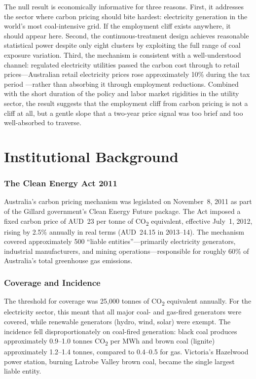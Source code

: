 \documentclass[12pt]{article}
\begin{document}
The null result is economically informative for three reasons. First, it addresses the sector where carbon pricing should bite hardest: electricity generation in the world's most coal-intensive grid. If the employment cliff exists anywhere, it should appear here. Second, the continuous-treatment design achieves reasonable statistical power despite only eight clusters by exploiting the full range of coal exposure variation. Third, the mechanism is consistent with a well-understood channel: regulated electricity utilities passed the carbon cost through to retail prices---Australian retail electricity prices rose approximately 10\% during the tax period \citep{ogorman2014impact}---rather than absorbing it through employment reductions. Combined with the short duration of the policy and labor market rigidities in the utility sector, the result suggests that the employment cliff from carbon pricing is not a cliff at all, but a gentle slope that a two-year price signal was too brief and too well-absorbed to traverse.


\section{Institutional Background}

\subsubsection*{The Clean Energy Act 2011} Australia's carbon pricing mechanism was legislated on November~8, 2011 as part of the Gillard government's Clean Energy Future package. The Act imposed a fixed carbon price of AUD~23 per tonne of CO\textsubscript{2} equivalent, effective July~1, 2012, rising by 2.5\% annually in real terms (AUD~24.15 in 2013--14). The mechanism covered approximately 500 ``liable entities''---primarily electricity generators, industrial manufacturers, and mining operations---responsible for roughly 60\% of Australia's total greenhouse gas emissions.

\subsubsection*{Coverage and Incidence} The threshold for coverage was 25,000 tonnes of CO\textsubscript{2} equivalent annually. For the electricity sector, this meant that all major coal- and gas-fired generators were covered, while renewable generators (hydro, wind, solar) were exempt. The incidence fell disproportionately on coal-fired generation: black coal produces approximately 0.9--1.0 tonnes CO\textsubscript{2} per MWh and brown coal (lignite) approximately 1.2--1.4 tonnes, compared to 0.4--0.5 for gas. Victoria's Hazelwood power station, burning Latrobe Valley brown coal, became the single largest liable entity.
\end{document}
